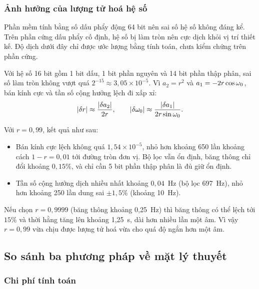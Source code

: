 \documentclass{dtmf_report}
\begin{document}
\subsubsection{Ảnh hưởng của lượng tử hoá hệ số}

Phần mềm tính bằng số dấu phẩy động 64 bit nên sai số hệ số không đáng kể. Trên
phần cứng dấu phẩy cố định, hệ số bị làm tròn nên cực dịch khỏi vị trí thiết kế.
Độ dịch dưới đây chỉ được ước lượng bằng tính toán, chưa kiểm chứng trên phần cứng.

Với hệ số 16 bit gồm 1 bit dấu, 1 bit phần nguyên và 14 bit phần thập phân, sai số
làm tròn không vượt quá $2^{-15} \approx 3{,}05 \times 10^{-5}$. Vì $a_{2} = r^{2}$
và $a_{1} = -2r\cos\omega_{0}$, bán kính cực và tần số cộng hưởng lệch đi xấp xỉ:
\begin{equation}\label{eq:luong-tu}
  |\delta r| \approx \frac{|\delta a_{2}|}{2r},
  \qquad
  |\delta\omega_{0}| \approx \frac{|\delta a_{1}|}{2r\sin\omega_{0}}.
\end{equation}

Với $r = 0{,}99$, kết quả như sau:
\begin{itemize}
  \item Bán kính cực lệch không quá $1{,}54 \times 10^{-5}$, nhỏ hơn khoảng
        650 lần khoảng cách $1 - r = 0{,}01$ tới đường tròn đơn vị. Bộ lọc vẫn ổn
        định, băng thông chỉ đổi khoảng $0{,}15\%$, và chỉ cần 5 bit phần thập phân
        là đủ giữ ổn định.
  \item Tần số cộng hưởng dịch nhiều nhất khoảng $0{,}04$~Hz (bộ lọc
        697~Hz), nhỏ hơn khoảng 250 lần dung sai $\pm 1{,}5\%$ (khoảng 10~Hz).
\end{itemize}

Nếu chọn $r = 0{,}9999$ (băng thông khoảng 0,25~Hz) thì băng thông có thể lệch tới
$15\%$ và thời hằng tăng lên khoảng 1,25~s, dài hơn nhiều lần một âm. Vì vậy
$r = 0{,}99$ vừa chịu được lượng tử hoá vừa cho quá độ ngắn hơn một âm.

\subsection{So sánh ba phương pháp về mặt lý thuyết}
\label{sub:so-sanh-ly-thuyet}

\subsubsection{Chi phí tính toán}
\label{sss:chi-phi}
\end{document}
